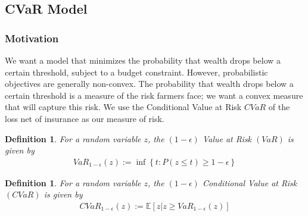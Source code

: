 \documentclass[11pt]{article}
\newtheorem{defn}[lemma]{Definition}
\begin{document}

  \subsection{CVaR Model}
  \subsubsection{Motivation}
    We want a model that minimizes the probability that wealth drops below a certain threshold, subject to a budget constraint. However, probabilistic objectives are generally non-convex. The probability that wealth drops below a certain threshold is a measure of the risk farmers face; we want a convex measure that will capture this risk. We use the Conditional Value at Risk $CVaR$ of the loss net of insurance as our measure of risk. 

  \begin{defn}
    For a random variable $z$, the $(1-\epsilon)$ Value at Risk $(VaR)$ is given by 
    \begin{align*}
      VaR_{1-\epsilon}(z) := \inf \left \{ t : P(z \leq t) \geq 1-\epsilon \right \}
    \end{align*}
  \end{defn}

  \begin{defn}
    For a random variable $z$, the $(1-\epsilon)$ Conditional Value at Risk $(CVaR)$ is given by 
    \begin{align*}
      CVaR_{1-\epsilon}(z) := \mathbb{E}\left [z | z \geq VaR_{1-\epsilon}(z) \right ]
    \end{align*}
  \end{defn}
\end{document}
